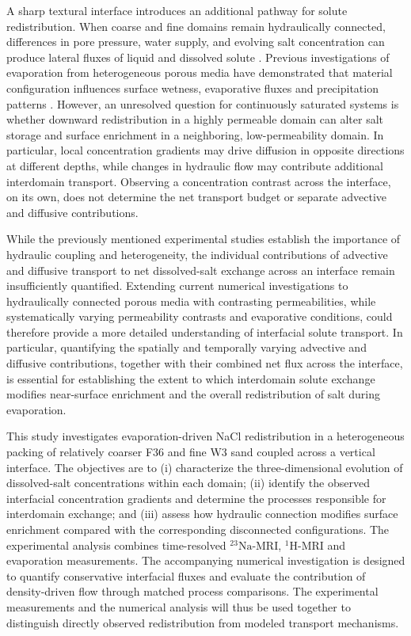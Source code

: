 \documentclass[final]{agujournal2019}
\newcommand{\NaIso}{\ensuremath{^{23}\mathrm{Na}}}
\newcommand{\HIso}{\ensuremath{^{1}\mathrm{H}}}
\begin{document}
A sharp textural interface introduces an additional pathway for solute
redistribution. When coarse and fine domains remain hydraulically connected,
differences in pore pressure, water supply, and evolving salt concentration can
produce lateral fluxes of liquid and dissolved solute
\cite{lehmann2009,shahraeeni2010}. Previous investigations of evaporation from
heterogeneous porous media have demonstrated that material configuration
influences surface wetness, evaporative fluxes and precipitation patterns
\cite{nachshon2011b,shokrikuehni2020}. However, an unresolved question for
continuously saturated systems is whether downward redistribution in a highly
permeable domain can alter salt storage and surface enrichment in a neighboring,
low-permeability domain. In particular, local concentration gradients may drive
diffusion in opposite directions at different depths, while changes in hydraulic
flow may contribute additional interdomain transport. Observing a concentration
contrast across the interface, on its own, does not determine the net transport
budget or separate advective and diffusive contributions.

While the previously mentioned experimental studies establish the importance of
hydraulic coupling and heterogeneity, the individual contributions of advective
and diffusive transport to net dissolved-salt exchange across an interface remain
insufficiently quantified. Extending current numerical investigations
\cite{wooding1997a,wooding1997b,bringedal2022,lasser2023,chen2026} to
hydraulically connected porous media with contrasting permeabilities, while
systematically varying permeability contrasts and evaporative conditions, could
therefore provide a more detailed understanding of interfacial solute transport.
In particular, quantifying the spatially and temporally varying advective and
diffusive contributions, together with their combined net flux across the
interface, is essential for establishing the extent to which interdomain solute
exchange modifies near-surface enrichment and the overall redistribution of salt
during evaporation.

This study investigates evaporation-driven NaCl redistribution in a
heterogeneous packing of relatively coarser F36 and fine W3 sand coupled across a
vertical interface. The objectives are to (i) characterize the three-dimensional
evolution of dissolved-salt concentrations within each domain; (ii) identify the
observed interfacial concentration gradients and determine the processes
responsible for interdomain exchange; and (iii) assess how hydraulic connection
modifies surface enrichment compared with the corresponding disconnected
configurations. The experimental analysis combines time-resolved \NaIso-MRI,
\HIso-MRI and evaporation measurements. The accompanying numerical investigation
is designed to quantify conservative interfacial fluxes and evaluate the
contribution of density-driven flow through matched process comparisons. The
experimental measurements and the numerical analysis will thus be used together
to distinguish directly observed redistribution from modeled transport
mechanisms.
\end{document}
